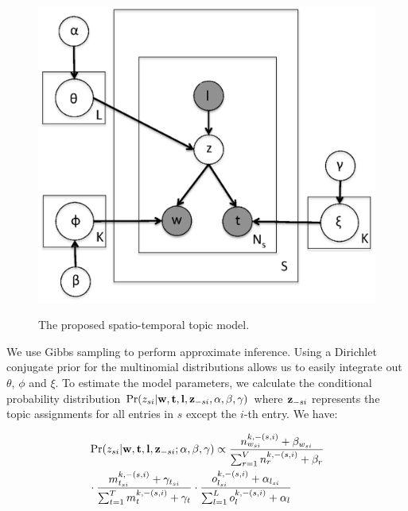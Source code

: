 \documentclass[twoside,leqno,twocolumn]{article}
\newcommand{\w}{{\bf w}}
\newcommand{\z}{{\bf z}}
\newcommand{\loc}{{\bf l}}
\newcommand{\tim}{{\bf t}}
\begin{document}
\begin{figure}[h]
\captionsetup{font=small}
\begin{center}
       \includegraphics[trim = 30mm 35mm 70mm 25mm, clip, scale=0.3]{fig/stm_model.eps} \label{fig:stm_model}
\end{center}
\vspace{-10pt}
\caption{The proposed spatio-temporal topic model.}
\vspace{-5pt}
\label{fig:stm_model}
\end{figure}

We use Gibbs sampling to perform approximate inference. Using a Dirichlet conjugate prior for the multinomial distributions allows us to easily integrate out $\theta$, $\phi$ and $\xi$.  To estimate the model parameters, we calculate the conditional probability distribution $\Pr(z_{si}|{\bf w},{\bf t}, {\bf l}, {\bf z}_{-si}, \alpha, \beta, \gamma)$ where ${\bf z}_{-si}$ represents the topic assignments for all entries in $s$ except the $i$-th entry. We have: \vspace{-10pt}

{\small \begin{align}
\label{eq:conditional}
&\Pr(z_{si}| \w,\tim,\loc,\z_{-si};\alpha,\beta,\gamma) \propto \frac{n^{k,-(s,i)}_{w_{si}} + \beta_{w_{si}}}{\sum_{r = 1}^V n^{k,-(s,i)}_{r} + \beta_{r}}  \nonumber \\
& \cdot \frac{m^{k,-(s,i)}_{t_{si}} + \gamma_{t_{si}}}{\sum_{t = 1}^T m^{k,-(s,i)}_{t} + \gamma_{t}} \cdot \frac{o^{k,-(s,i)}_{l_{si}} + \alpha_{l_{si}}}{\sum_{l = 1}^L o^{k,-(s,i)}_{l} + \alpha_{l}}
\end{align}}
\end{document}
